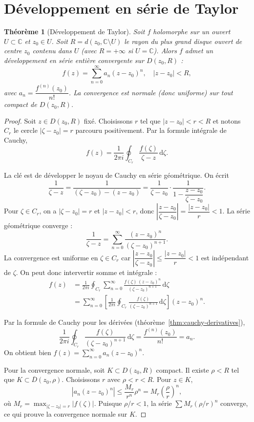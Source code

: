 \documentclass[12pt,a4paper,openany]{book}
\theoremstyle{definition}
\theoremstyle{plain}
\newtheorem{theoreme}[definition]{Théorème}
\theoremstyle{remark}
\newcommand{\C}{\mathbb{C}}
\newcommand{\dd}{\mathrm{d}}
\newcommand{\abs}[1]{\left|#1\right|}
\begin{document}
\section{Développement en série de Taylor}

\begin{theoreme}[Développement de Taylor]\label{thm:taylor-series}
Soit $f$ holomorphe sur un ouvert $U \subset \C$ et $z_0 \in U$.
Soit $R = d(z_0, \C \setminus U)$ le rayon du plus grand disque ouvert
de centre $z_0$ contenu dans $U$ (avec $R = +\infty$ si $U = \C$).
Alors $f$ admet un développement en série entière convergente sur
$D(z_0,R)$ :
\[
  f(z) = \sum_{n=0}^{\infty} a_n (z - z_0)^n, \quad \abs{z - z_0} < R,
\]
avec $a_n = \dfrac{f^{(n)}(z_0)}{n!}$. La convergence est normale
(donc uniforme) sur tout compact de $D(z_0,R)$.
\end{theoreme}

\begin{proof}
Soit $z \in D(z_0, R)$ fixé. Choisissons $r$ tel que
$\abs{z - z_0} < r < R$ et notons $C_r$ le cercle $\abs{\zeta - z_0} = r$
parcouru positivement. Par la formule intégrale de Cauchy,
\[
  f(z) = \frac{1}{2\pi i}\oint_{C_r}
  \frac{f(\zeta)}{\zeta - z}\,\dd\zeta.
\]

La clé est de développer le noyau de Cauchy en série géométrique. On
écrit
\[
  \frac{1}{\zeta - z}
  = \frac{1}{(\zeta - z_0) - (z - z_0)}
  = \frac{1}{\zeta - z_0}\cdot
    \frac{1}{1 - \dfrac{z - z_0}{\zeta - z_0}}.
\]
Pour $\zeta \in C_r$, on a $\abs{\zeta - z_0} = r$ et
$\abs{z - z_0} < r$, donc
$\abs{\dfrac{z-z_0}{\zeta - z_0}} = \dfrac{\abs{z-z_0}}{r} < 1$.
La série géométrique converge :
\[
  \frac{1}{\zeta - z}
  = \sum_{n=0}^{\infty} \frac{(z - z_0)^n}{(\zeta - z_0)^{n+1}}.
\]
La convergence est uniforme en $\zeta \in C_r$ car
$\abs{\dfrac{z-z_0}{\zeta - z_0}} \leq \dfrac{\abs{z-z_0}}{r} < 1$
est indépendant de $\zeta$. On peut donc intervertir somme et intégrale :
\begin{align*}
  f(z) &= \frac{1}{2\pi i}\oint_{C_r}
  \sum_{n=0}^{\infty}\frac{f(\zeta)\,(z-z_0)^n}{(\zeta - z_0)^{n+1}}
  \,\dd\zeta \\
  &= \sum_{n=0}^{\infty}\left[\frac{1}{2\pi i}\oint_{C_r}
  \frac{f(\zeta)}{(\zeta - z_0)^{n+1}}\,\dd\zeta\right](z-z_0)^n.
\end{align*}

Par la formule de Cauchy pour les dérivées
(théorème~\ref{thm:cauchy-derivatives}),
\[
  \frac{1}{2\pi i}\oint_{C_r}\frac{f(\zeta)}{(\zeta-z_0)^{n+1}}\,\dd\zeta
  = \frac{f^{(n)}(z_0)}{n!} = a_n.
\]
On obtient bien $f(z) = \displaystyle\sum_{n=0}^\infty a_n(z-z_0)^n$.

Pour la convergence normale, soit $K \subset D(z_0,R)$ compact. Il
existe $\rho < R$ tel que $K \subset \overline{D}(z_0,\rho)$. Choisissons
$r$ avec $\rho < r < R$. Pour $z \in K$,
\[
  \abs{a_n(z-z_0)^n} \leq \frac{M_r}{r^n}\rho^n
  = M_r\left(\frac{\rho}{r}\right)^n,
\]
où $M_r = \max_{\abs{\zeta - z_0}=r}\abs{f(\zeta)}$. Puisque
$\rho/r < 1$, la série $\sum M_r(\rho/r)^n$ converge, ce qui prouve
la convergence normale sur $K$.
\end{proof}
\end{document}

